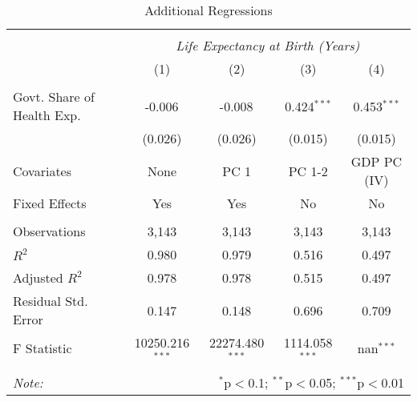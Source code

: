 \begin{table}[!htbp] \centering
  \caption{Additional Regressions \label{additional_regs}}
\begin{tabular}{@{\extracolsep{5pt}}lcccc}
\\[-1.8ex]\hline
\hline \\[-1.8ex]
& \multicolumn{4}{c}{\textit{Life Expectancy at Birth (Years)}} \
\cr \
\\[-1.8ex] & (1) & (2) & (3) & (4) \\
\hline \\[-1.8ex]
 Govt. Share of Health Exp. & -0.006$^{}$ & -0.008$^{}$ & 0.424$^{***}$ & 0.453$^{***}$ \\
  & (0.026) & (0.026) & (0.015) & (0.015) \\
 Covariates & None & PC 1 & PC 1-2 & GDP PC (IV) \\
 Fixed Effects & Yes & Yes & No & No \\
\hline \\[-1.8ex]
 Observations & 3,143 & 3,143 & 3,143 & 3,143 \\
 $R^2$ & 0.980 & 0.979 & 0.516 & 0.497 \\
 Adjusted $R^2$ & 0.978 & 0.978 & 0.515 & 0.497 \\
 Residual Std. Error & 0.147 & 0.148 & 0.696 & 0.709  \\
 F Statistic & 10250.216$^{***}$  & 22274.480$^{***}$  & 1114.058$^{***}$  & nan$^{***}$  \\
\hline
\hline \\[-1.8ex]
\textit{Note:} & \multicolumn{4}{r}{$^{*}$p$<$0.1; $^{**}$p$<$0.05; $^{***}$p$<$0.01} \\
\end{tabular}
\end{table}